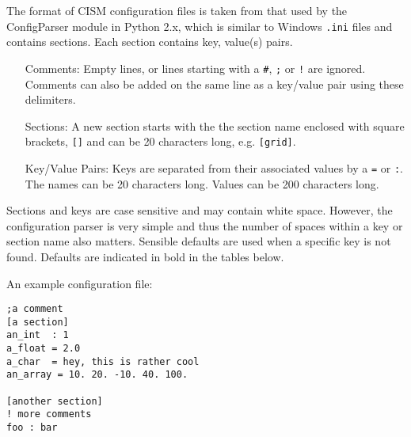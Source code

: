 The format of CISM configuration files is taken from that used by the 
ConfigParser module in Python 2.x, which is similar to Windows \texttt{.ini} files 
and contains sections. Each section contains key, value(s) pairs.

\begin{itemize}
\item[Comments:] Empty lines, or lines starting with a \texttt{\#}, \texttt{;} or \texttt{!} are ignored.  Comments can also be added on the same line as a key/value pair using these delimiters.
\item[Sections:] A new section starts with the the section name enclosed with square brackets, \texttt{[]} and can be 20 characters long, e.g. \texttt{[grid]}.
\item[Key/Value Pairs:] Keys are separated from their associated values by a \texttt{=} or \texttt{:}. The names can be 20 characters long. Values can be 200 characters long.
\end{itemize}

Sections and keys are case sensitive and may contain white space. 
However, the configuration parser is very simple and thus the number of spaces 
within a key or section name also matters. Sensible defaults are used when 
a specific key is not found.  Defaults are indicated in bold in the tables below.

An example configuration file:
\begin{verbatim}
;a comment
[a section]
an_int  : 1
a_float = 2.0
a_char  = hey, this is rather cool
an_array = 10. 20. -10. 40. 100.

[another section]
! more comments
foo : bar
\end{verbatim}



